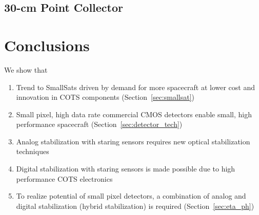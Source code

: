 \documentclass[10pt,journal]{IEEEtran}  %
\begin{document}
\begin{table}[h!]
\centering
{}
\caption{Dependent system parameters for optimized 1-m system}
\label{table:1m_parameters}
\end{table}

\subsection{30-cm Point Collector} 

\section{Conclusions}
\label{sec:conclusions}

We show that

\begin{enumerate}
    \item Trend to SmallSats driven by demand for more spacecraft at lower cost and innovation in COTS components (Section~\ref{sec:smallsat})
    \item Small pixel, high data rate commercial CMOS detectors enable small, high performance spacecraft (Section~\ref{sec:detector_tech})
    \item Analog stabilization with staring sensors requires new optical stabilization techniques
    \item Digital stabilization with staring sensors is made possible due to high performance COTS electronics
    \item To realize potential of small pixel detectors, a combination of analog and digital stabilization (hybrid stabilization) is required (Section~\ref{sec:eta_ph})
\end{enumerate}
\end{document}
